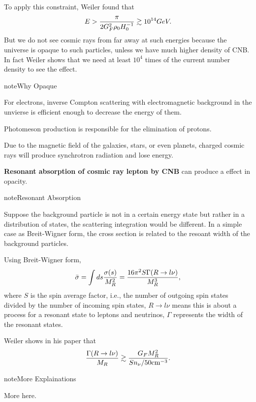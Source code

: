 \documentclass[letterpaper,12pt,english]{sphinxmanual}
\begin{document}
To apply this constraint, Weiler found that
\begin{gather}
\begin{split}E > \frac{\pi}{2 G_F^2 \rho_0 H_0^{-1}} \gtrsim 10^{14} GeV.\end{split}\notag
\end{gather}
But we do not see cosmic rays from far away at such energies because the universe is opaque to such particles, unless we have much higher density of CNB. In fact Weiler shows that we need at least \(10^4\) times of the current number density to see the effect.

\begin{notice}{note}{Why Opaque}

For electrons, inverse Compton scattering with electromagnetic background in the unvierse is efficient enough to decrease the energy of them. \footnotemark[6]

Photomeson production is responsible for the elimination of protons.

Due to the magnetic field of the galaxies, stars, or even planets, charged cosmic rays will produce synchrotron radiation and lose energy.
\end{notice}

\textbf{Resonant absorption of cosmic ray lepton by CNB} can produce a effect in opacity. \footnotemark[6]

\begin{notice}{note}{Resonant Absorption}

Suppose the background particle is not in a certain energy state but rather in a distribution of states, the scattering integration would be different. In a simple case as Breit-Wigner form, the cross section is related to the resoant width of the background particles.
\end{notice}

Using Breit-Wigner form, \footnotemark[6]
\begin{gather}
\begin{split}\bar\sigma = \int ds \frac{\sigma(s)}{M_R^2} = \frac{16\pi^2 S \Gamma(R\to l\nu)}{M_R^3},\end{split}\notag
\end{gather}
where \(S\) is the spin average factor, i.e., the number of outgoing spin states divided by the number of incoming spin states, \(R\to l\nu\) means this is about a process for a resonant state to leptons and neutrinos, \(\Gamma\) represents the width of the resonant states.

Weiler shows in his paper that
\begin{gather}
\begin{split}\frac{\Gamma(R\to l\nu)}{ M_R } \gtrsim \frac{ G_F M_R^2 }{ S n_\nu/ 50 \mathrm{cm}^{-3} }.\end{split}\notag
\end{gather}
\begin{notice}{note}{More Explainations}

More here.
\end{notice}
\end{document}
